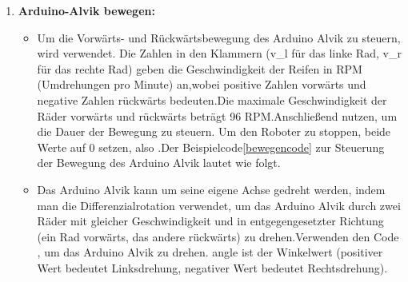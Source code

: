 \begin{enumerate}
	\item \textbf{Arduino-Alvik bewegen:}
	\begin{itemize}
		\item Um die Vorwärts- und Rückwärtsbewegung des Arduino Alvik zu steuern, wird  verwendet. Die Zahlen in den Klammern (v\_l für das linke Rad, v\_r für das rechte Rad) geben die Geschwindigkeit der Reifen in RPM (Umdrehungen pro Minute) an,wobei positive Zahlen vorwärts und negative Zahlen rückwärts bedeuten.Die maximale Geschwindigkeit der Räder vorwärts und rückwärts beträgt 96 RPM.Anschlie\ss end  nutzen, um die Dauer der Bewegung zu steuern. Um den Roboter zu stoppen, beide Werte auf 0 setzen, also .Der Beispielcode\ref{bewegencode} zur Steuerung der Bewegung des Arduino Alvik lautet wie folgt.
		\item Das Arduino Alvik kann um seine eigene Achse gedreht werden, indem man die Differenzialrotation verwendet, um das Arduino Alvik durch zwei Räder mit gleicher Geschwindigkeit und in entgegengesetzter Richtung (ein Rad vorwärts, das andere rückwärts) zu drehen.Verwenden den Code , um das Arduino Alvik zu drehen. angle ist der Winkelwert (positiver Wert bedeutet Linksdrehung, negativer Wert bedeutet Rechtsdrehung).
	\end{itemize} 
	{
		\label{bewegencode}	
		{	\pythonstyle
			}
}
\end{enumerate}
